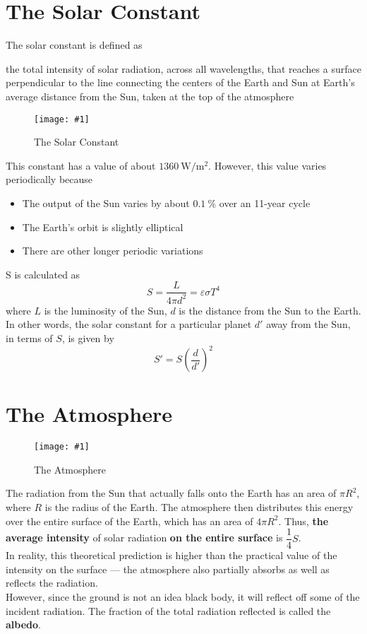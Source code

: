 \documentclass[a4paper,12pt]{article}
\let\oldsection\section
\renewcommand\section{\clearpage\oldsection}
\newcommand{\lb}{\\[8pt]}
\newcommand{\img}[4]{\begin{center}
  \begin{figure}[H]
    \centering
    \texttt{[image: \#1]}
    \caption{#3}
    \label{fig:#4}
  \end{figure}
\end{center}}
\newcommand{\paren}[1]{\left(#1\right)}
\begin{document}
\section{The Solar Constant}

The solar constant is defined as

\begin{center}
  the total intensity of solar radiation, across all wavelengths, that reaches a surface perpendicular to the line connecting the centers of the Earth and Sun at Earth's average distance from the Sun, taken at the top of the atmosphere
\end{center}

\img{solar-constant.jpg}{1}{The Solar Constant}{solar-constant}

This constant has a value of about $\SI{1360}{\watt\per\meter\squared}$. However, this value varies periodically because
\begin{itemize}
  \item The output of the Sun varies by about $\SI{0.1}{\percent}$ over an 11-year cycle
  \item The Earth's orbit is slightly elliptical
  \item There are other longer periodic variations
\end{itemize}

S is calculated as
$$S = \frac{L}{4\pi d^2} = \varepsilon \sigma T^4$$
where $L$ is the luminosity of the Sun, $d$ is the distance from the Sun to the Earth. In other words, the solar constant for a particular planet $d'$ away from the Sun, in terms of $S$, is given by
\begin{equation}\label{eq:solar-constant}
  S' = S \paren{\frac{d}{d'}}^2
\end{equation}

\section{The Atmosphere}

\img{atm_rad.png}{0.5}{The Atmosphere}{atm-rad}

The radiation from the Sun that actually falls onto the Earth has an area of $\pi R^2$, where $R$ is the radius of the Earth. The atmosphere then distributes this energy over the entire surface of the Earth, which has an area of $4\pi R^2$. Thus, \textbf{the average intensity} of solar radiation \textbf{on the entire surface} is $\dfrac{1}{4}S$.\lb
In reality, this theoretical prediction is higher than the practical value of the intensity on the surface --- the atmosphere also partially absorbs as well as reflects the radiation.\lb
However, since the ground is not an idea black body, it will reflect off some of the incident radiation. The fraction of the total radiation reflected is called the \textbf{albedo}.
\end{document}
